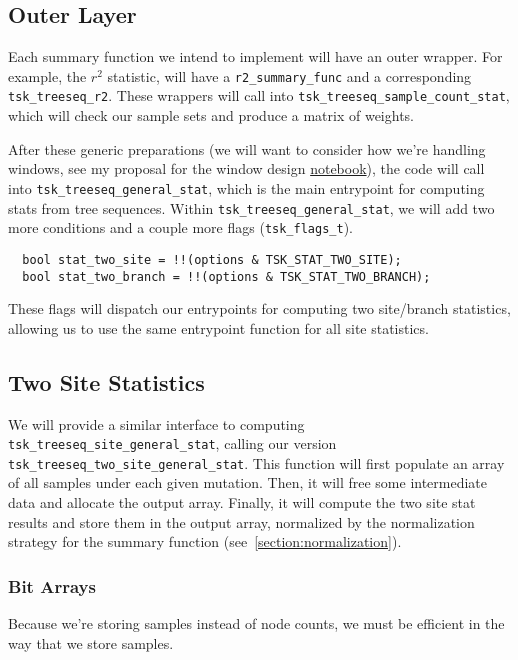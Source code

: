 \documentclass[12pt]{article}
\newcommand{\ccode}[1]{\texttt{#1}}
\begin{document}
\subsection{Outer Layer}

Each summary function we intend to implement will have an outer wrapper. For
example, the $r^2$ statistic, will have a \ccode{r2_summary_func} and a
corresponding \ccode{tsk_treeseq_r2}. These wrappers will call into
\ccode{tsk_treeseq_sample_count_stat}, which will check our sample sets and
produce a matrix of weights.

After these generic preparations (we will want to consider how we're handling
windows, see my proposal for the window design
\href{https://github.com/lkirk/ts-two-locus-proto/blob/main/notebooks/Windows.ipynb}{notebook}),
the code will call into \ccode{tsk_treeseq_general_stat}, which is the main
entrypoint for computing stats from tree sequences. Within
\ccode{tsk_treeseq_general_stat}, we will add two more conditions and a couple
more flags (\ccode{tsk_flags_t}).

\begin{verbatim}
  bool stat_two_site = !!(options & TSK_STAT_TWO_SITE);
  bool stat_two_branch = !!(options & TSK_STAT_TWO_BRANCH);
\end{verbatim}

These flags will dispatch our entrypoints for computing two site/branch
statistics, allowing us to use the same entrypoint function for all site
statistics.

\subsection{Two Site Statistics}

We will provide a similar interface to computing
\ccode{tsk_treeseq_site_general_stat}, calling our version
\ccode{tsk_treeseq_two_site_general_stat}. This function will first populate an
array of all samples under each given mutation. Then, it will free some
intermediate data and allocate the output array. Finally, it will compute the
two site stat results and store them in the output array, normalized by the
normalization strategy for the summary function (see~\ref{section:normalization}).

\subsubsection{Bit Arrays}\label{section:bit_array}
Because we're storing samples instead of node counts, we must be efficient in
the way that we store samples.
\end{document}

